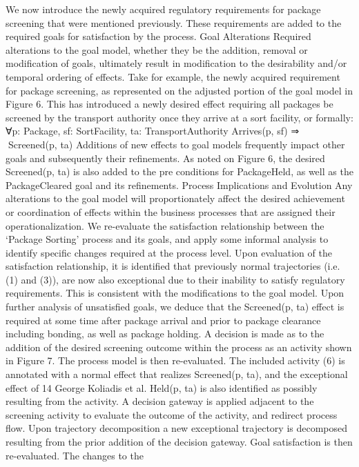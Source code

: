 We now introduce the newly acquired regulatory requirements for package screening that were mentioned previously. These requirements are added to the required goals for satisfaction by the process.
Goal Alterations Required alterations to the goal model, whether they be
the addition, removal or modification of goals, ultimately result in modification
to the desirability and/or temporal ordering of effects. Take for example, the
newly acquired requirement for package screening, as represented on the adjusted
portion of the goal model in Figure 6. This has introduced a newly desired effect
requiring all packages be screened by the transport authority once they arrive at
a sort facility, or formally:
∀p: Package, sf: SortFacility, ta: TransportAuthority
Arrives(p, sf) ⇒ Screened(p, ta)
Additions of new effects to goal models frequently impact other goals and
subsequently their refinements. As noted on Figure 6, the desired Screened(p, ta)
is also added to the pre conditions for PackageHeld, as well as the PackageCleared
goal and its refinements.
Process Implications and Evolution Any alterations to the goal model will
proportionately affect the desired achievement or coordination of effects within
the business processes that are assigned their operationalization. We re-evaluate
the satisfaction relationship between the ‘Package Sorting’ process and its goals,
and apply some informal analysis to identify specific changes required at the
process level.
Upon evaluation of the satisfaction relationship, it is identified that previously normal trajectories (i.e. (1) and (3)), are now also exceptional due to their
inability to satisfy regulatory requirements. This is consistent with the modifications to the goal model.
Upon further analysis of unsatisfied goals, we deduce that the Screened(p,
ta) effect is required at some time after package arrival and prior to package
clearance including bonding, as well as package holding. A decision is made as
to the addition of the desired screening outcome within the process as an activity
shown in Figure 7.
The process model is then re-evaluated. The included activity (6) is annotated
with a normal effect that realizes Screened(p, ta), and the exceptional effect of
14 George Koliadis et al.
Held(p, ta) is also identified as possibly resulting from the activity. A decision
gateway is applied adjacent to the screening activity to evaluate the outcome
of the activity, and redirect process flow. Upon trajectory decomposition a new
exceptional trajectory is decomposed resulting from the prior addition of the
decision gateway. Goal satisfaction is then re-evaluated. The changes to the
